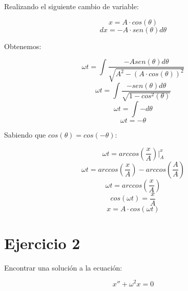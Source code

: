 \documentclass[letter,11pt]{article}
\begin{document}
Realizando el siguiente cambio de variable:

\begin{equation*}
    x = A \cdot cos(\theta)
\end{equation*}
\begin{equation*}
    dx = - A \cdot sen(\theta) d\theta
\end{equation*}

Obtenemos:

\begin{equation*}
    \omega t = \int \frac{-A sen(\theta) d\theta}{\sqrt{A^2 - (A \cdot cos(\theta))^2}}
\end{equation*}
\begin{equation*}
    \omega t = \int \frac{- sen(\theta) d\theta}{\sqrt{1 - cos^2(\theta)}}
\end{equation*}
\begin{equation*}
    \omega t = \int - d\theta
\end{equation*}
\begin{equation*}
    \omega t = - \theta
\end{equation*}

Sabiendo que $cos(\theta) = cos(-\theta)$:

\begin{equation*}
    \omega t = arccos\left(\frac{x}{A}\right) \Biggr|_{A}^{x}
\end{equation*}
\begin{equation*}
    \omega t = arccos\left(\frac{x}{A}\right) - arccos\left(\frac{A}{A}\right)
\end{equation*}
\begin{equation*}
    \omega t = arccos\left(\frac{x}{A}\right)
\end{equation*}
\begin{equation*}
    cos(\omega t) = \frac{x}{A}
\end{equation*}
\begin{equation}
    x = A \cdot cos(\omega t)
\end{equation}

\section{Ejercicio 2}

Encontrar una solución a la ecuación:

\begin{equation}
    x'' + \omega^2 x = 0
\end{equation}
\end{document}
